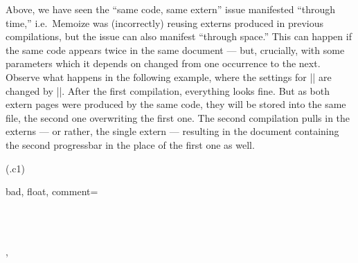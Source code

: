 \documentclass[a4paper,11pt]{article}
\begin{document}
Above, we have seen the ``same code, same extern'' issue manifested ``through
time,'' i.e.\ Memoize was (incorrectly) reusing externs produced in previous
compilations, but the issue can also manifest ``through space.''  This can
happen if the same code appears twice in the same document --- but, crucially,
with some parameters which it depends on changed from one occurrence to the
next.  Observe what happens in the following example, where the settings for
|\progressbar| are changed by |\progressbarchange|.  After the first
compilation, everything looks fine.  But as both extern pages were produced by
the same code, they will be stored into the same file, the second one
overwriting the first one.  The second compilation pulls in the externs --- or
rather, the single extern --- resulting in the document containing the second
progressbar in the place of the first one as well.

(.c1){
  bad, float,
  comment={
    \begin{tcbitemize}[raster columns=3,raster equal height,halign=center,valign=center]
      \tcbitem[title=After 1\textsuperscript{st} compilation]
      \\
      \\
      \tcbitem[title=After extern extraction\vphantom{p\textsuperscript{nd}}]
      \tcbitem[title=After 2\textsuperscript{nd} compilation]
    \end{tcbitemize}
  },
}
\end{document}

